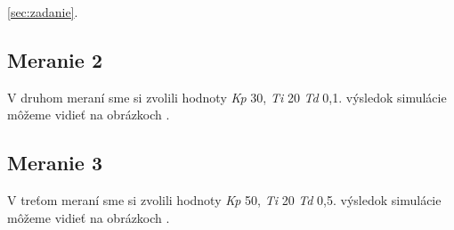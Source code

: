 \documentclass{article}
\begin{document}
\clearpage

\ref{sec:zadanie}.

\clearpage

\subsection{Meranie 2}
\label{sec:meranie2}

V druhom meraní sme si zvolili hodnoty \textit{Kp} 30, \textit{Ti} 20 \textit{Td} 0,1. výsledok simulácie môžeme vidieť na obrázkoch  .

\clearpage




\subsection{Meranie 3}
\label{sec:meranie3}

V treťom meraní sme si zvolili hodnoty \textit{Kp} 50, \textit{Ti} 20 \textit{Td} 0,5. výsledok simulácie môžeme vidieť na obrázkoch  .

\end{document}
